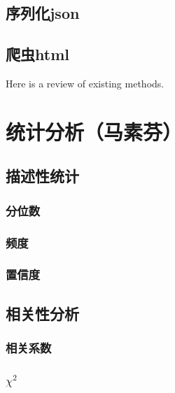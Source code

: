 \documentclass[]{book}
\begin{document}
\hypertarget{json}{%
\section{序列化json}\label{json}}

\hypertarget{html}{%
\section{爬虫html}\label{html}}

Here is a review of existing methods.

\hypertarget{section-17}{%
\chapter{统计分析（马素芬）}\label{section-17}}

\hypertarget{section-18}{%
\section{描述性统计}\label{section-18}}

\hypertarget{section-19}{%
\subsection{分位数}\label{section-19}}

\hypertarget{section-20}{%
\subsection{频度}\label{section-20}}

\hypertarget{section-21}{%
\subsection{置信度}\label{section-21}}

\hypertarget{section-22}{%
\section{相关性分析}\label{section-22}}

\hypertarget{section-23}{%
\subsection{相关系数}\label{section-23}}

\hypertarget{chi2}{%
\subsection{\texorpdfstring{\(\chi^2\)}{\textbackslash{}chi\^{}2}}\label{chi2}}
\end{document}
